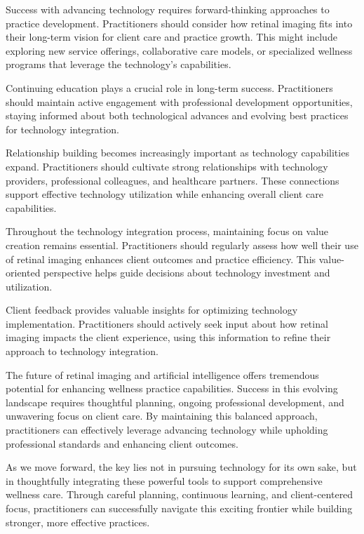 \documentclass[
  Letterpaper,
]{scrbook}
\begin{document}
Success with advancing technology requires forward-thinking approaches
to practice development. Practitioners should consider how retinal
imaging fits into their long-term vision for client care and practice
growth. This might include exploring new service offerings,
collaborative care models, or specialized wellness programs that
leverage the technology's capabilities.

Continuing education plays a crucial role in long-term success.
Practitioners should maintain active engagement with professional
development opportunities, staying informed about both technological
advances and evolving best practices for technology integration.

Relationship building becomes increasingly important as technology
capabilities expand. Practitioners should cultivate strong relationships
with technology providers, professional colleagues, and healthcare
partners. These connections support effective technology utilization
while enhancing overall client care capabilities.

Throughout the technology integration process, maintaining focus on
value creation remains essential. Practitioners should regularly assess
how well their use of retinal imaging enhances client outcomes and
practice efficiency. This value-oriented perspective helps guide
decisions about technology investment and utilization.

Client feedback provides valuable insights for optimizing technology
implementation. Practitioners should actively seek input about how
retinal imaging impacts the client experience, using this information to
refine their approach to technology integration.

The future of retinal imaging and artificial intelligence offers
tremendous potential for enhancing wellness practice capabilities.
Success in this evolving landscape requires thoughtful planning, ongoing
professional development, and unwavering focus on client care. By
maintaining this balanced approach, practitioners can effectively
leverage advancing technology while upholding professional standards and
enhancing client outcomes.

As we move forward, the key lies not in pursuing technology for its own
sake, but in thoughtfully integrating these powerful tools to support
comprehensive wellness care. Through careful planning, continuous
learning, and client-centered focus, practitioners can successfully
navigate this exciting frontier while building stronger, more effective
practices.
\end{document}

